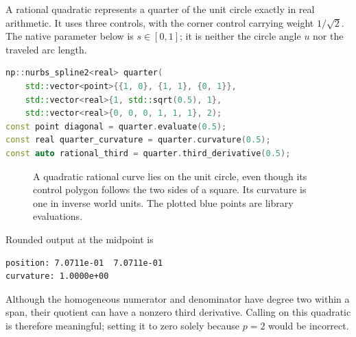A rational quadratic represents a quarter of the unit circle exactly in real
arithmetic. It uses three controls, with the corner control carrying weight
$1/\sqrt2$. The native parameter below is $s\in[0,1]$; it is neither the circle
angle $u$ nor the traveled arc length.

\begin{lstlisting}[language=C++,caption={An exact rational quadratic quarter circle.}]
np::nurbs_spline2<real> quarter(
    std::vector<point>{{1, 0}, {1, 1}, {0, 1}},
    std::vector<real>{1, std::sqrt(0.5), 1},
    std::vector<real>{0, 0, 0, 1, 1, 1}, 2);
const point diagonal = quarter.evaluate(0.5);
const real quarter_curvature = quarter.curvature(0.5);
const auto rational_third = quarter.third_derivative(0.5);
\end{lstlisting}

\begin{figure}[tbp]
\centering
{}
\caption{A quadratic rational curve lies on the unit circle, even though its
control polygon follows the two sides of a square. Its curvature is one in
inverse world units. The plotted blue points are library evaluations.}
\label{fig:rational-circle}
\end{figure}

Rounded output at the midpoint is
\begin{lstlisting}[caption={Rounded numerical preview; scientific precision is four decimals.}]
position: 7.0711e-01  7.0711e-01
curvature: 1.0000e+00
\end{lstlisting}
Although the homogeneous numerator and denominator have degree two within a
span, their quotient can have a nonzero third derivative. Calling
 on this quadratic is therefore meaningful; setting it
to zero solely because $p=2$ would be incorrect.

